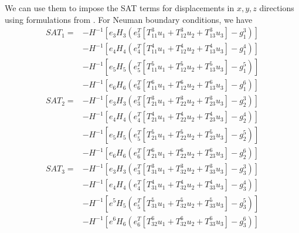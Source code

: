 We can use them to impose the SAT terms for displacements in $x, y, z$ directions using formulations from \citep{ALMQUIST2021109842}.
For Neuman boundary conditions, we have
\begin{align}
    SAT_1 = &-H^{-1} [e_3 H_3 (e_3^T [T_{11}^3 u_1 + T_{12}^3 u_2 + T_{13}^3 u_3] - g_1^3)] \nonumber \\
&- H^{-1} [e_4 H_4 (e_4^T [T_{11}^4 u_1 + T_{12}^4 u_2 + T_{13}^4 u_3] - g_1^4)] \nonumber \\
&- H^{-1} [e_5 H_5 (e_5^T [T_{11}^5 u_1 + T_{12}^5 u_2 + T_{13}^5 u_3] - g_1^5)] \nonumber \\
&- H^{-1} [e_6 H_6 (e_6^T [T_{11}^6 u_1 + T_{12}^6 u_2 + T_{13}^6 u_3] - g_1^6)] \\
SAT_2 = &-H^{-1} [e_3 H_3 (e_3^T [T_{21}^3 u_1 + T_{22}^3 u_2 + T_{23}^3 u_3] - g_2^3)] \nonumber \\
& - H^{-1} [e_4 H_4 (e_4^T [T_{21}^4 u_1 + T_{22}^4 u_2 + T_{23}^4 u_3] - g_2^4)] \nonumber \\
& - H^{-1} [e_5 H_5 (e_5^T [T_{21}^5 u_1 + T_{22}^5 u_2 + T_{23}^5 u_3] - g_2^5)] \nonumber \\
& - H^{-1} [e_6 H_6 (e_6^T [T_{21}^6 u_1 + T_{22}^6 u_2 + T_{23}^6 u_3] - g_2^6)] \\
SAT_3 = &-H^{-1} [e_3 H_3 (e_3^T [T_{31}^3 u_1 + T_{32}^3 u_2 + T_{33}^3 u_3] - g_3^3)] \nonumber\\
& - H^{-1} [e_4 H_4 (e_4^T [T_{31}^4 u_1 + T_{32}^4 u_2 + T_{33}^4 u_3] - g_3^4)] \nonumber\\
& - H^{-1} [e^5 H_5 (e_5^T [T_{31}^5 u_1 + T_{32}^5 u_2 + T_{33}^5 u_3] - g_3^5)] \nonumber\\
& - H^{-1} [e^6 H_6 (e_6^T [T_{32}^6 u_1 + T_{32}^6 u_2 + T_{33}^6 u_3] - g_3^6)]
\label{eqn:neumann-condition}
\end{align}


